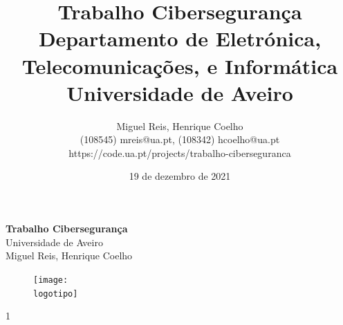 \documentclass{report}
\begin{document}
\def\titulo{Trabalho Cibersegurança}
\def\data{19 de dezembro de 2021}
\def\autores{Miguel Reis, Henrique Coelho}
\def\autorescontactos{(108545) mreis@ua.pt, (108342) hcoelho@ua.pt}
\def\versao{1}
\def\departamento{Departamento de Eletrónica, Telecomunicações, e Informática}
\def\empresa{Universidade de Aveiro}
\def\logotipo{ua.pdf}
\def\projeto{https://code.ua.pt/projects/trabalho-ciberseguranca}

%
%
\begin{titlepage}

\begin{center}
%
\vspace*{50mm}
%
{\Huge \textbf{\titulo}}\\ 
%
\vspace{10mm}
%
{\Large {\empresa}}\\
%
\vspace{10mm}
%
{\LARGE \autores}\\ 
%
\vspace{20mm}
%
\begin{figure}[h]
\center
\texttt{[image: \\logotipo]}
\end{figure}
%
\vspace{30mm}
\end{center}
%
\begin{flushright}
\versao
\end{flushright}
\end{titlepage}

\title{%
{\Huge\textbf{\titulo}}\\
\vspace{5mm}
{\Large \departamento\\ \empresa}
}
%
\author{%
    \autores \\
    \autorescontactos\\
\projeto}

%
\date{\data}
%
\maketitle

\end{document}
